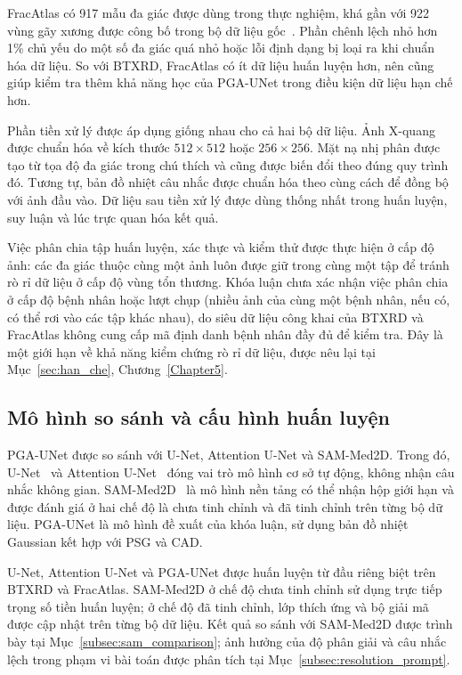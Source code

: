 FracAtlas có 917 mẫu đa giác được dùng trong thực nghiệm, khá gần với 922 vùng gãy xương được công bố trong bộ dữ liệu gốc~\cite{fracatlas2023}. Phần chênh lệch nhỏ hơn 1\% chủ yếu do một số đa giác quá nhỏ hoặc lỗi định dạng bị loại ra khi chuẩn hóa dữ liệu. So với BTXRD, FracAtlas có ít dữ liệu huấn luyện hơn, nên cũng giúp kiểm tra thêm khả năng học của PGA-UNet trong điều kiện dữ liệu hạn chế hơn.

Phần tiền xử lý được áp dụng giống nhau cho cả hai bộ dữ liệu. Ảnh X-quang được chuẩn hóa về kích thước $512\times512$ hoặc $256\times256$. Mặt nạ nhị phân được tạo từ tọa độ đa giác trong chú thích và cũng được biến đổi theo đúng quy trình đó. Tương tự, bản đồ nhiệt câu nhắc được chuẩn hóa theo cùng cách để đồng bộ với ảnh đầu vào. Dữ liệu sau tiền xử lý được dùng thống nhất trong huấn luyện, suy luận và lúc trực quan hóa kết quả.

Việc phân chia tập huấn luyện, xác thực và kiểm thử được thực hiện ở cấp độ ảnh: các đa giác thuộc cùng một ảnh luôn được giữ trong cùng một tập để tránh rò rỉ dữ liệu ở cấp độ vùng tổn thương. Khóa luận chưa xác nhận việc phân chia ở cấp độ bệnh nhân hoặc lượt chụp (nhiều ảnh của cùng một bệnh nhân, nếu có, có thể rơi vào các tập khác nhau), do siêu dữ liệu công khai của BTXRD và FracAtlas không cung cấp mã định danh bệnh nhân đầy đủ để kiểm tra. Đây là một giới hạn về khả năng kiểm chứng rò rỉ dữ liệu, được nêu lại tại Mục~\ref{sec:han_che}, Chương~\ref{Chapter5}.
\subsection{Mô hình so sánh và cấu hình huấn luyện}
\label{subsec:models_compared}

PGA-UNet được so sánh với U-Net, Attention U-Net và SAM-Med2D. Trong đó, U-Net~\cite{ronneberger2015unet} và Attention U-Net~\cite{oktay2018attentionunet} đóng vai trò mô hình cơ sở tự động, không nhận câu nhắc không gian. SAM-Med2D~\cite{2023-SAMMed2D-Cheng} là mô hình nền tảng có thể nhận hộp giới hạn và được đánh giá ở hai chế độ là chưa tinh chỉnh và đã tinh chỉnh trên từng bộ dữ liệu. PGA-UNet là mô hình đề xuất của khóa luận, sử dụng bản đồ nhiệt Gaussian kết hợp với PSG và CAD.

U-Net, Attention U-Net và PGA-UNet được huấn luyện từ đầu riêng biệt trên BTXRD và FracAtlas. SAM-Med2D ở chế độ chưa tinh chỉnh sử dụng trực tiếp trọng số tiền huấn luyện; ở chế độ đã tinh chỉnh, lớp thích ứng và bộ giải mã được cập nhật trên từng bộ dữ liệu. Kết quả so sánh với SAM-Med2D được trình bày tại Mục~\ref{subsec:sam_comparison}; ảnh hưởng của độ phân giải và câu nhắc lệch trong phạm vi bài toán được phân tích tại Mục~\ref{subsec:resolution_prompt}.


